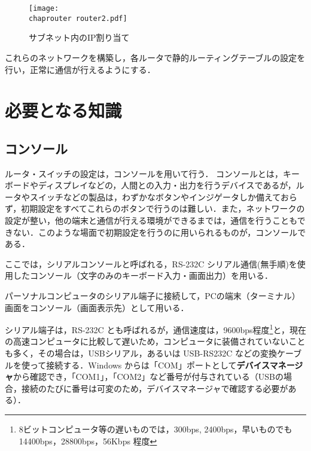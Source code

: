 \begin{figure}[tb]
\begin{center}
 \texttt{[image: \\chaprouter router2.pdf]}
 \caption{サブネット内のIP割り当て}
 \label{fig:16:ipadress}
\end{center} 
\end{figure}

これらのネットワークを構築し，各ルータで静的ルーティングテーブルの設定を
行い，正常に通信が行えるようにする．

\section{必要となる知識}


\subsection{コンソール}
ルータ・スイッチの設定は，コンソールを用いて行う．
コンソールとは，キーボードやディスプレイなどの，人間との入力・出力を行うデバイスであるが，ルータやスイッチなどの製品は，わずかなボタンやインジゲータしか備えておらず，初期設定をすべてこれらのボタンで行うのは難しい．また，ネットワークの設定が整い，他の端末と通信が行える環境ができるまでは，通信を行うこともできない．このような場面で初期設定を行うのに用いられるものが，コンソールである．

ここでは，シリアルコンソールと呼ばれる，RS-232C シリアル通信(無手順)を使用したコンソール（文字のみのキーボード入力・画面出力）を用いる．

パーソナルコンピュータのシリアル端子に接続して，PCの端末（ターミナル）画面をコンソール（画面表示先）として用いる．

シリアル端子は，RS-232C とも呼ばれるが，通信速度は，9600bps程度\footnote{8ビットコンピュータ等の遅いものでは，300bps, 2400bps，早いものでも 14400bps，28800bps，56Kbps 程度}と，現在の高速コンピュータに比較して遅いため，コンピュータに装備されていないことも多く，その場合は，USBシリアル，あるいは USB-RS232C などの変換ケーブルを使って接続する．Windows からは「COM」ポートとして\textbf{デバイスマネージャ}から確認でき，「COM1」，「COM2」など番号が付与されている（USBの場合，接続のたびに番号は可変のため，デバイスマネージャで確認する必要がある）．

